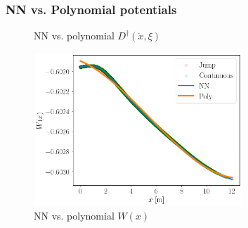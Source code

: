 \subsubsection{NN vs. Polynomial potentials}
\begin{figure}[H]
    \centering
    \caption{NN vs. polynomial $D^\dagger(\dot{x}, \xi)$}
    \label{fig:DDaggerPolyPlotCompare}
\end{figure}
\begin{figure}[H]
    \centering
    \includegraphics[width=0.7\textwidth]{images/Trial0216_combined_800_W_polyerr.png}
    \caption{NN vs. polynomial $W(x)$}
\end{figure}

